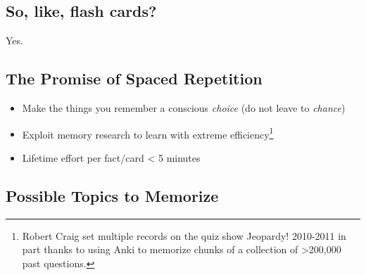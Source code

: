 \documentclass[]{tufte-handout}
\begin{document}
\subsection{So, like, flash cards?}

Yes.

\subsection{The Promise of Spaced Repetition}
\begin{itemize}
	\item Make the things you remember a conscious \textit{choice} (do not leave to \textit{chance})
	\item Exploit memory research to learn with extreme efficiency\footnote{Robert Craig set multiple records on the quiz show Jeopardy! 2010-2011 in part thanks to using Anki to memorize chunks of a collection of >200,000 past questions.}
	\item Lifetime effort per fact/card < 5 minutes
\end{itemize}

\subsection{Possible Topics to Memorize}
\end{document}
